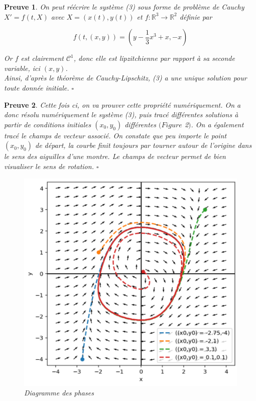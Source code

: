 \documentclass{article}
\newtheorem{preuve}{Preuve}
\begin{document}
\begin{preuve}
On peut réécrire le système (3) sous forme de problème de Cauchy $X' = f(t,X) $ avec $X=(x(t),y(t))$
et $f:\mathbb{R}^3 \to \mathbb{R}^2$ définie par

\begin{equation}
    f(t,(x,y)) = (y - \frac{1}{3} x^3 + x,-x)
\end{equation}

Or $f$ est clairement $\mathcal{C}^1$, donc elle est lipzitchienne par rapport à sa seconde variable, ici $(x,y)$.
\\Ainsi, d'après le théorème de Cauchy-Lipschitz, (3) a une unique solution pour toute donnée initiale. $\square$
\end{preuve}

\begin{preuve}

Cette fois ci, on va prouver cette propriété numériquement. 
On a donc résolu numériquement le système (3), puis tracé différentes solutions à partir de conditions initiales $(x_0,y_0)$ différentes $(Figure$ 2$)$.
On a également tracé le champs de vecteur associé. On constate que peu importe le point $(x_0,y_0)$ de départ, la courbe finit toujours par tourner autour de l'origine dans le sens des aiguilles d'une montre.
Le champs de vecteur permet de bien visualiser le sens de rotation. $\square$

\begin{figure}[!h]
\centering
\includegraphics[scale=0.4]{../images/plot_solh.png}
\caption{Diagramme des phases}
\end{figure}

\end{preuve}
\end{document}
